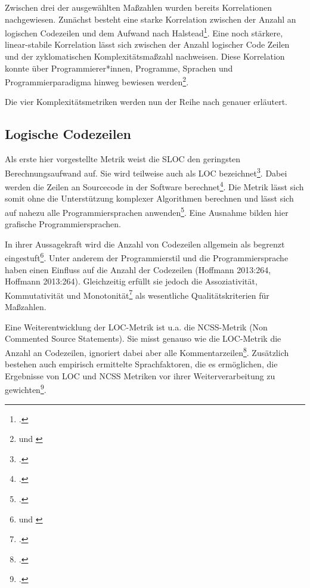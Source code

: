 Zwischen drei der ausgewählten Ma\ss zahlen wurden bereits Korrelationen
nachgewiesen. Zunächst besteht eine starke Korrelation zwischen der
Anzahl an logischen Codezeilen und dem Aufwand nach Halstead\footcite[Vgl. ][S. 627]{jonesAppliedSoftwareMeasurement2008}. Eine noch stärkere, linear-stabile Korrelation lässt sich
zwischen der Anzahl logischer Code Zeilen und der zyklomatischen
Komplexitätsma\ss zahl nachweisen. Diese Korrelation konnte über
Programmierer*innen, Programme, Sprachen und Programmierparadigma hinweg
bewiesen werden\footnote{\cite[Vgl. ][S. 627]{jonesAppliedSoftwareMeasurement2008} und \cite[S. 137]{jayCyclomaticComplexityLines2009}}.

Die vier Komplexitätsmetriken werden nun der Reihe nach genauer
erläutert.

\subsection{Logische Codezeilen}\label{logische-codezeilen}

Als erste hier vorgestellte Metrik weist die \ac{SLOC} den geringsten Berechnungsaufwand auf. Sie wird
teilweise auch als \ac{LOC} bezeichnet\footcite[Vgl. ][S. 263]{hoffmannSoftwareQualitat2013}. Dabei werden die Zeilen an Sourcecode in der Software
berechnet\footcite[Vgl. ][S. 2]{rumreichExaminingSoftwareDesign2019}. Die Metrik lässt
sich somit ohne die Unterstützung komplexer Algorithmen berechnen und
lässt sich auf nahezu alle Programmiersprachen anwenden\footcite[Vgl. ][S. 263]{hoffmannSoftwareQualitat2013}. Eine Ausnahme bilden hier grafische
Programmiersprachen.

In ihrer Aussagekraft wird die Anzahl von Codezeilen allgemein als
begrenzt eingestuft\footnote{\cite[Vgl. ][S. 264]{hoffmannSoftwareQualitat2013} 
und \cite[S. 2]{rumreichExaminingSoftwareDesign2019}}. Unter anderem der Programmierstil und die Programmiersprache
haben einen Einfluss auf die Anzahl der Codezeilen (Hoffmann 2013:264,
Hoffmann 2013:264). Gleichzeitig erfüllt sie jedoch die Assoziativität,
Kommutativität und Monotonität\footcite[Vgl. ][S. 142]{zuseSoftwareComplexityMeasures1991} als wesentliche Qualitätskriterien für Ma\ss zahlen.

Eine Weiterentwicklung der LOC-Metrik ist u.a. die NCSS-Metrik (Non
Commented Source Statements). Sie misst genauso wie die LOC-Metrik die
Anzahl an Codezeilen, ignoriert dabei aber alle Kommentarzeilen\footcite[Vgl. ][S. 264]{hoffmannSoftwareQualitat2013}. Zusätzlich bestehen auch empirisch ermittelte
Sprachfaktoren, die es ermöglichen, die Ergebnisse von LOC und NCSS
Metriken vor ihrer Weiterverarbeitung zu gewichten\footcite[Vgl. ][S. 264]{hoffmannSoftwareQualitat2013}.

